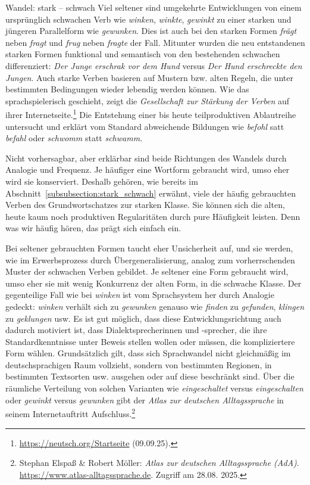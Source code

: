 \begin{Exkurs}{Wandel: stark -- schwach}
Viel seltener sind umgekehrte Entwicklungen von einem ursprünglich schwachen Verb wie \textit{winken}, \textit{winkte}, \textit{gewinkt} zu einer starken und jüngeren Parallelform wie \textit{gewunken}. Dies ist auch bei den starken Formen \textit{frägt} neben \textit{fragt} und \textit{frug} neben \textit{fragte} der Fall. Mitunter wurden die neu entstandenen starken Formen funktional und semantisch von den bestehenden schwachen differenziert: \textit{Der Junge erschrak vor dem Hund} versus \textit{Der Hund erschreckte den Jungen}. Auch starke Verben basieren auf Mustern bzw. alten Regeln, die unter bestimmten Bedingungen wieder lebendig werden können. Wie das sprachspielerisch geschieht, zeigt die \textit{Gesellschaft zur Stärkung der Verben} auf ihrer Internetseite.\footnote{\url{https://neutsch.org/Startseite} (09.09.25).} Die Entstehung einer bis heute teilproduktiven Ablautreihe untersucht \citet[73–81]{Nowak2015} und erklärt vom Standard abweichende Bildungen wie \textit{befohl} satt \textit{befahl} oder \textit{schwomm} statt \textit{schwamm}.

Nicht vorhersagbar, aber erklärbar sind beide Richtungen des Wandels durch Analogie und Frequenz. Je häufiger eine Wortform gebraucht wird, umso eher wird sie konserviert. Deshalb gehören, wie bereits im Abschnitt~\ref{subsubsection:stark_schwach} erwähnt, viele der häufig gebrauchten Verben des Grundwortschatzes zur starken Klasse. Sie können sich die alten, heute kaum noch produktiven Regularitäten durch pure Häufigkeit leisten. Denn was wir häufig hören, das prägt sich einfach ein.

Bei seltener gebrauchten Formen taucht eher Unsicherheit auf, und sie werden, wie im Erwerbsprozess durch Übergeneralisierung, analog zum vorherrschenden Muster der schwachen Verben gebildet. Je seltener eine Form gebraucht wird, umso eher  sie mit wenig Konkurrenz der alten Form, in die schwache Klasse. Der gegenteilige Fall wie bei \textit{winken} ist vom Sprachsystem her durch Analogie gedeckt: \textit{winken} verhält sich zu \textit{gewunken} genauso wie \textit{finden} zu \textit{gefunden}, \textit{klingen} zu \textit{geklungen} usw. Es ist gut möglich, dass diese Entwicklungsrichtung auch dadurch motiviert ist, dass Dialektsprecherinnen und -sprecher, die ihre Standardkenntnisse unter Beweis stellen wollen oder müssen, die kompliziertere Form wählen. Grundsätzlich gilt, dass sich Sprachwandel nicht gleichmäßig im deutschsprachigen Raum vollzieht, sondern von bestimmten Regionen, in bestimmten Textsorten usw. ausgehen oder auf diese beschränkt sind. Über die räumliche Verteilung von solchen Varianten wie \textit{eingeschaltet} versus \textit{eingeschalten} oder \textit{gewinkt} versus \textit{gewunken} gibt der \textit{Atlas zur deutschen Alltagssprache} in seinem Internetauftritt Aufschluss.\footnote{Stephan Elspaß \& Robert Möller: \textit{Atlas zur deutschen Alltagssprache (AdA)}. \url{https://www.atlas-alltagssprache.de}. Zugriff am 28.08. 2025.}

\end{Exkurs}

